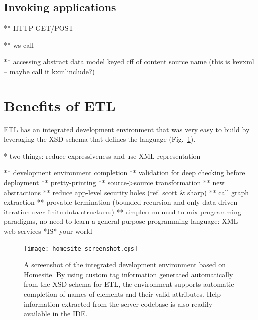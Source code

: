 \documentclass{www2003-submission}
\newcommand{\figref}[1]{Fig.~\ref{fig-#1}}
\begin{document}
\subsection{Invoking applications}

** HTTP GET/POST

** ws-call

** accessing abstract data model keyed off of content source name
(this is kevxml -- maybe call it kxmlinclude?)


\section{Benefits of ETL}
\label{sec-benefits}

ETL has an integrated development environment that was very
easy to build by leveraging the XSD schema that defines the language
(\figref{homesite-screenshot}).

* two things: reduce expressiveness and use XML representation

** development environment completion
** validation for deep checking before deployment
** pretty-printing 
** source->source transformation 
** new abstractions 
** reduce app-level security holes (ref. scott \& sharp)
** call graph extraction
** provable termination (bounded recursion and only data-driven iteration over finite data structures)
** simpler: no need to mix programming paradigms, no need to learn a general purpose programming language: XML + web services *IS* your world

\begin{figure}[tb]
\begin{centering}
\hspace*{-0.05\linewidth}\texttt{[image: homesite-screenshot.eps]}
\caption{A screenshot of the integrated development environment based
on Homesite.  By using custom tag information generated automatically
from the XSD schema for ETL, the environment supports automatic
completion of names of elements and their valid attributes.  Help
information extracted from the server codebase is also readily
available in the IDE\@.
\label{fig-homesite-screenshot}}
\end{centering}
\end{figure}
\end{document}

